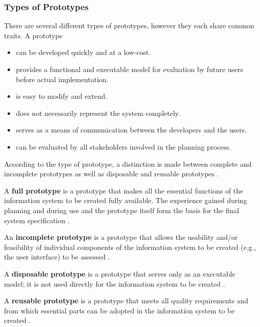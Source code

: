 \subsubsection*{Types of Prototypes}

There are several different types of prototypes,
however they each share common traits.
A prototype
\autocite{riedlManagementInformatik2019}

\begin{itemize}
	\item can be developed quickly and at a low-cost.
	\item provides a functional and executable model for evaluation by future users before actual implementation.
	\item is easy to modify and extend.
	\item does not necessarily represent the system completely.
	\item serves as a means of communication between the developers and the users.
	\item can be evaluated by all stakeholders involved in the planning process.
\end{itemize}

According to the type of prototype, a distinction is made between complete and incomplete prototypes
as well as disposable and reusable prototypes
\autocite{riedlManagementInformatik2019}.

A \textbf{full prototype} is a prototype that makes all the essential functions of the information system to be created fully available.
The experience gained during planning and during use and the prototype itself form the basis for the final system specification
\autocite{riedlManagementInformatik2019}.

An \textbf{incomplete prototype} is a prototype that allows the usability and/or feasibility of individual components
of the information system to be created (e.g., the user interface) to be assessed
\autocite{riedlManagementInformatik2019}.

A \textbf{disposable prototype} is a prototype that serves only as an executable model;
it is not used directly for the information system to be created
\autocite{riedlManagementInformatik2019}.

A \textbf{reusable prototype} is a prototype that meets all quality requirements and from which
essential parts can be adopted in the information system to be created
\autocite{riedlManagementInformatik2019}.

%

